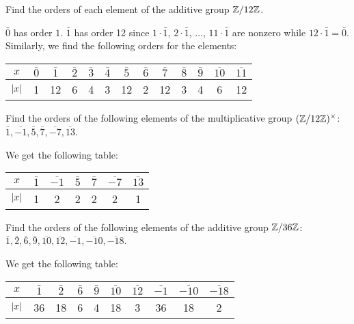  Find the orders of each element of the additive group
$\mathbb{Z}/12\mathbb{Z}$.
\begin{solution}
  $\bar0$ has order $1$. $\bar1$ has order 12 since $1\cdot\bar1$,
  $2\cdot\bar1$, $\ldots$, $11\cdot\bar1$ are nonzero while
  $12\cdot\bar1 = \bar0$. Similarly, we find the following orders for
  the elements:

  \begin{center}
    \begin{tabular}{c|c|c|c|c|c|c|c|c|c|c|c|c}
      $x$ & $\bar0$ & $\bar1$ & $\bar2$ & $\bar3$ & $\bar4$ & $\bar5$ & $\bar6$
      & $\bar7$ & $\bar8$ & $\bar9$ & $\overline{10}$ & $\overline{11}$ \\\hline
      $\lvert{x}\rvert$ & 1 & 12 & 6 & 4 & 3 & 12 & 2 & 12 & 3 & 4 & 6 & 12
    \end{tabular}
  \end{center}
\end{solution}

 Find the orders of the following elements of the
multiplicative group $(\mathbb{Z}/12\mathbb{Z})^\times$:
$\bar1, \overline{-1}, \bar5, \bar7, \overline{-7}, \overline{13}$.
\begin{solution}
  We get the following table:
  \begin{center}
    \begin{tabular}{c|c|c|c|c|c|c}
      $x$ & $\bar1$ & $\overline{-1}$ & $\bar5$ & $\bar7$ & $\overline{-7}$
      & $\overline{13}$ \\\hline
      $\lvert{x}\rvert$ & 1 & 2 & 2 & 2 & 2 & 1
    \end{tabular}
  \end{center}
\end{solution}

 Find the orders of the following elements of the
additive group $\mathbb{Z}/36\mathbb{Z}$:
$\bar1, \bar2, \bar6, \bar9, \overline{10}, \overline{12},
\overline{-1}, \overline{-10}, \overline{-18}$.
\begin{solution}
  We get the following table:

  \begin{center}
    \begin{tabular}{c|c|c|c|c|c|c|c|c|c}
      $x$ & $\bar1$ & $\bar2$ & $\bar6$ & $\bar9$ & $\overline{10}$
      & $\overline{12}$ & $\overline{-1}$ & $\overline{-10}$
      & $\overline{-18}$ \\\hline
      $\lvert{x}\rvert$ & 36 & 18 & 6 & 4 & 18 & 3 & 36 & 18 & 2
    \end{tabular}
  \end{center}
\end{solution}

